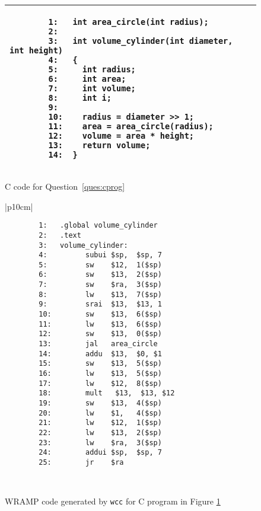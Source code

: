 \documentclass[a4paper,10pt]{article}
\begin{document}
\begin{enumerate}
\newpage
\begin{figure}[t]
\begin{footnotesize}
\begin{center}
\begin{tabular}{|p{10cm}|}
\hline
\begin{verbatim}
        1:   int area_circle(int radius);
        2:
        3:   int volume_cylinder(int diameter, int height)
        4:   {
        5:     int radius;
        6:     int area;
        7:     int volume;
        8:     int i;
        9: 
        10:    radius = diameter >> 1;
        11:    area = area_circle(radius);
        12:    volume = area * height;
        13:    return volume;
        14:  }
\end{verbatim}
\\
\hline
\end{tabular}
\end{center}
\end{footnotesize}
\caption{C code for Question~\ref{ques:cprog}}
\label{fig:cprog}
\end{figure}

\begin{figure}[h]
\begin{footnotesize}
\begin{center}
\begin{tabular}{|p{10cm}|}
\hline
\begin{verbatim}
        1:   .global volume_cylinder
        2:   .text
        3:   volume_cylinder:
        4:         subui $sp,  $sp, 7
        5:         sw    $12,  1($sp)
        6:         sw    $13,  2($sp)
        7:         sw    $ra,  3($sp)
        8:         lw    $13,  7($sp)
        9:         srai  $13,  $13, 1
        10:        sw    $13,  6($sp)
        11:        lw    $13,  6($sp)
        12:        sw    $13,  0($sp)
        13:        jal   area_circle
        14:        addu  $13,  $0, $1
        15:        sw    $13,  5($sp)
        16:        lw    $13,  5($sp)
        17:        lw    $12,  8($sp)
        18:        mult   $13,  $13, $12
        19:        sw    $13,  4($sp)
        20:        lw    $1,   4($sp)
        21:        lw    $12,  1($sp)
        22:        lw    $13,  2($sp)
        23:        lw    $ra,  3($sp)
        24:        addui $sp,  $sp, 7
        25:        jr    $ra
\end{verbatim}
\\
\hline
\end{tabular}
\end{center}
\end{footnotesize}
\caption{WRAMP code generated by \texttt{wcc} for C program in Figure
\ref{fig:cprog}}
\label{fig:wrampgen}
\end{figure}


\end{enumerate}
\end{document}
